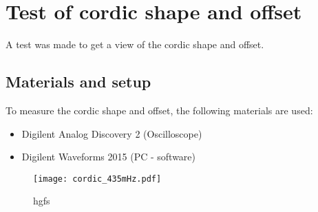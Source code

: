 \chapter{Test of cordic shape and offset}\label{app:cordic_shape}
A test was made to get a view of the cordic shape and offset.

\section*{Materials and setup}
To measure the cordic shape and offset, the following materials are used:
\begin{itemize}
\item Digilent Analog Discovery 2 (Oscilloscope)
\item Digilent Waveforms 2015 (PC - software)
\end{itemize}

\begin{figure}[htbp!]
	\centering
		\texttt{[image: cordic\_435mHz.pdf]}
		\caption{hgfs}
		\label{fig:appendix:cordic_435mHz}
\end{figure}